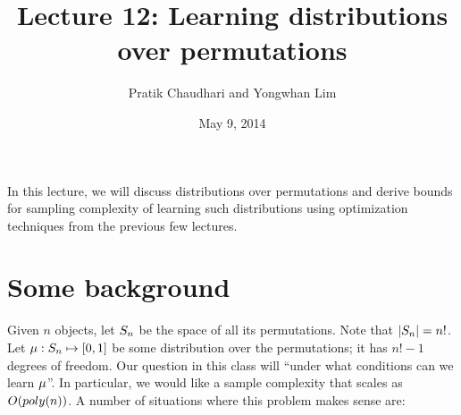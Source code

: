 \documentclass[letterpaper, 11pt, reqno]{amsart}
\title{Lecture 12: Learning distributions over permutations}
\date{May 9, 2014}
\author{Pratik Chaudhari and Yongwhan Lim}
\begin{document}
\maketitle

In this lecture, we will discuss distributions over permutations and derive bounds for sampling complexity of learning such distributions using optimization techniques from the previous few lectures.

\section{Some background}

Given $n$ objects, let $S_n$ be the space of all its permutations. Note that $\left| S_n \right| = n!$. Let $\mu : S_n \mapsto [0,1]$ be some distribution over the permutations; it has $n!-1$ degrees of freedom. Our question in this class will ``under what conditions can we learn $\mu$''. In particular, we would like a sample complexity that scales as $O(poly(n))$. A number of situations where this problem makes sense are:
\end{document}
